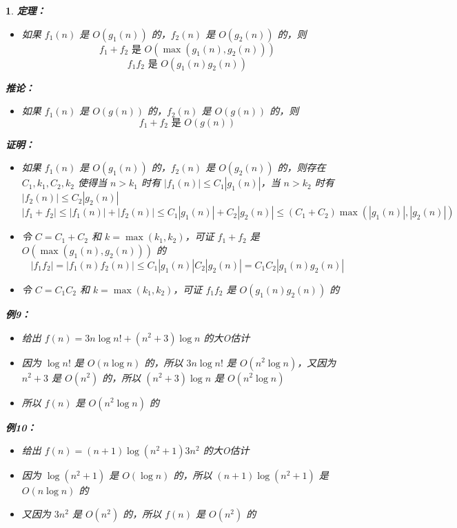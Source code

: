 \documentclass[UTF8]{report}
\theoremstyle{MyLineTheoremStyle} %
\theoremstyle{MyBlockTheoremStyle} %
\theoremstyle{MySubsubsectionStyle} %
\newtheorem{definition}{}
\begin{document}
\begin{definition}
    \textbf{定理：}
    \begin{itemize}
        \item 如果 $f_1(n)$ 是 $O(g_1(n))$ 的，$f_2(n)$ 是 $O(g_2(n))$ 的，则
        \[
        f_1 + f_2 \text{ 是 } O(\max(g_1(n), g_2(n)))
        \]
        \[
        f_1 f_2 \text{ 是 } O(g_1(n) g_2(n))
        \]
    \end{itemize}

    \textbf{推论：}
    \begin{itemize}
        \item 如果 $f_1(n)$ 是 $O(g(n))$ 的，$f_2(n)$ 是 $O(g(n))$ 的，则
        \[
        f_1 + f_2 \text{ 是 } O(g(n))
        \]
    \end{itemize}

    \textbf{证明：}
\begin{itemize}
    \item 如果 $f_1(n)$ 是 $O(g_1(n))$ 的，$f_2(n)$ 是 $O(g_2(n))$ 的，则存在 $C_1, k_1, C_2, k_2$ 使得当 $n > k_1$ 时有 $|f_1(n)| \leq C_1 |g_1(n)|$，当 $n > k_2$ 时有 $|f_2(n)| \leq C_2 |g_2(n)|$
    \[
    |f_1 + f_2| \leq |f_1(n)| + |f_2(n)| \leq C_1 |g_1(n)| + C_2 |g_2(n)| \leq (C_1 + C_2) \max(|g_1(n)|, |g_2(n)|)
    \]
    \item 令 $C = C_1 + C_2$ 和 $k = \max(k_1, k_2)$，可证 $f_1 + f_2$ 是 $O(\max(g_1(n), g_2(n)))$ 的
    \[
    |f_1 f_2| = |f_1(n) f_2(n)| \leq C_1 |g_1(n)| C_2 |g_2(n)| = C_1 C_2 |g_1(n) g_2(n)|
    \]
    \item 令 $C = C_1 C_2$ 和 $k = \max(k_1, k_2)$，可证 $f_1 f_2$ 是 $O(g_1(n) g_2(n))$ 的
\end{itemize}

\textbf{例9：}
\begin{itemize}
    \item 给出 $f(n) = 3n \log n! + (n^2 + 3) \log n$ 的大O估计
    \item 因为 $\log n!$ 是 $O(n \log n)$ 的，所以 $3n \log n!$ 是 $O(n^2 \log n)$，又因为 $n^2 + 3$ 是 $O(n^2)$ 的，所以 $(n^2 + 3) \log n$ 是 $O(n^2 \log n)$
    \item 所以 $f(n)$ 是 $O(n^2 \log n)$ 的
\end{itemize}

\textbf{例10：}
\begin{itemize}
    \item 给出 $f(n) = (n+1) \log(n^2 +1) 3n^2$ 的大O估计
    \item 因为 $\log(n^2+1)$ 是 $O(\log n)$ 的，所以 $(n +1) \log(n^2+1)$ 是 $O(n \log n)$ 的
    \item 又因为 $3n^2$ 是 $O(n^2)$ 的，所以 $f(n)$ 是 $O(n^2)$ 的
\end{itemize}
\end{definition}
\end{document}
